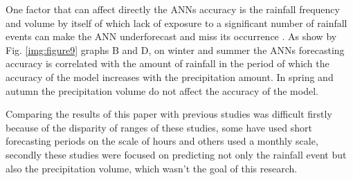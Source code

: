One factor that can affect directly the ANNs accuracy is the rainfall frequency and volume by itself of which lack of exposure to a significant number of rainfall events can make the ANN underforecast and miss its occurrence \cite{kuligowski1998experiments}. As show by Fig. \ref{img:figure9} graphs B and D, on winter and summer the ANNs forecasting accuracy is correlated with the amount of rainfall in the period of which the accuracy of the model increases with the precipitation amount. In spring and autumn the precipitation volume do not affect the accuracy of the model. 

Comparing the results of this paper with previous studies \cite{kumarasiri2006rainfall, kuligowski1998experiments, nasseri2008optimized, hall1999precipitation, ramirez2006linear, rajurkar2002artificial} was difficult firstly because of the disparity of ranges of these studies, some have used short forecasting periods on the scale of hours and others used a monthly scale, secondly these studies were focused on predicting not only the rainfall event but also the precipitation volume, which wasn't the goal of this research. 
















